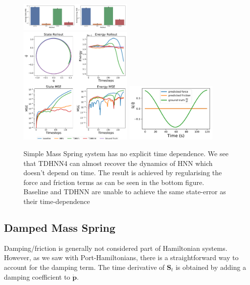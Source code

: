 \documentclass[twoside]{article}
\begin{document}
\begin{figure}[h!]
\centering
\includegraphics[width=0.5\textwidth]{figures/mass_spring_errors.pdf}
\includegraphics[width=0.5\textwidth]{figures/mass_spring_long.pdf}
\includegraphics[width=0.4\textwidth]{figures/mass_spring_pred_force.pdf}
\caption{Simple Mass Spring system has no explicit time dependence. We see that TDHNN4 can almost recover the dynamics of HNN which doesn't depend on time. The result is achieved by regularising the force and friction terms as can be seen in the bottom figure. Baseline and TDHNN are unable to achieve the same state-error as their time-dependence }
\end{figure}


\subsection{Damped Mass Spring}

Damping/friction is generally not considered part of Hamiltonian systems. However, as we saw with Port-Hamiltonians, there is a straightforward way to account for the damping term. The time derivative of $\mathbf{S}_t$ is obtained by adding a damping coefficient to $\dot{\mathbf{p}}$. 
\end{document}
